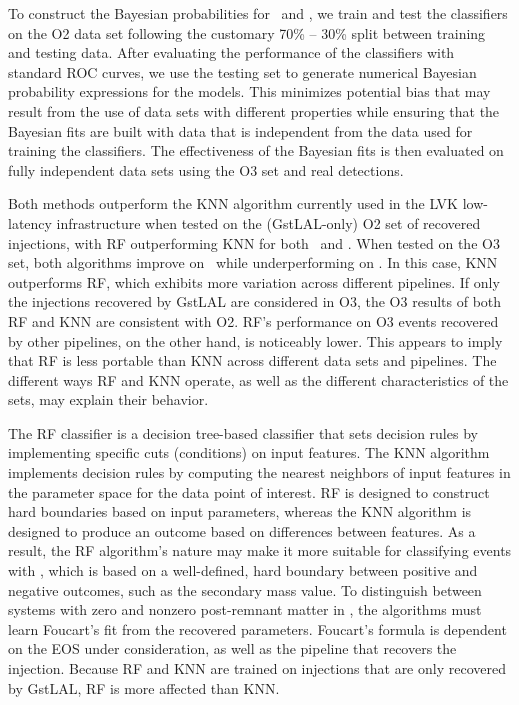 To construct the Bayesian probabilities for \hasns\ and \hasrem, we train and test the classifiers on the \ac{O2} data set following the customary 70\% -- 30\% split between
training and testing data. After evaluating the performance of the classifiers with standard \ac{ROC} curves, we use the testing set to generate numerical Bayesian probability
expressions for the models. This minimizes potential bias that may result from the use of data sets with different properties while ensuring that the Bayesian fits are built with
data that is independent from the data used for training the classifiers. The effectiveness of the Bayesian fits is then evaluated on fully independent data sets using the
\ac{O3} set and real detections. 


Both methods outperform the \ac{KNN} algorithm currently used in the \ac{LVK} low-latency infrastructure when tested on the (GstLAL-only) \ac{O2} set of recovered injections, with
\ac{RF} outperforming \ac{KNN} for both \hasns\ and \hasrem. When tested on the \ac{O3} set, both algorithms improve on \hasns\ while underperforming on \hasrem.  In this case,
\ac{KNN} outperforms \ac{RF}, which exhibits more variation across different pipelines.  If only the injections recovered by GstLAL are considered in \ac{O3}, the \ac{O3} results of
both \ac{RF} and \ac{KNN} are consistent with \ac{O2}. \ac{RF}'s performance on \ac{O3} events recovered by other pipelines, on the other hand, is noticeably lower. This appears to
imply that \ac{RF} is less portable than \ac{KNN} across different data sets and pipelines. The different ways \ac{RF} and \ac{KNN} operate, as well as the different characteristics
of the sets, may explain their behavior.

The RF classifier is a decision tree-based classifier that sets decision rules by implementing specific cuts (conditions) on input features. The \ac{KNN} algorithm implements decision rules by computing the nearest neighbors of input features in the parameter space for the data point of interest. \ac{RF} is designed to construct hard boundaries based on input parameters, whereas the \ac{KNN} algorithm is designed to produce an outcome based on differences between features. As a result, the \ac{RF} algorithm's nature may make it more suitable for classifying events with \hasns, which is based on a well-defined, hard boundary between positive and negative outcomes, such as the secondary mass value. To distinguish between systems with zero and nonzero post-remnant matter in \hasrem, the algorithms must learn Foucart's fit from the recovered parameters. Foucart's formula is dependent on the \ac{EOS} under consideration, as well as the pipeline that recovers the injection. Because \ac{RF} and \ac{KNN} are trained on injections that are only recovered by GstLAL, \ac{RF} is more affected than \ac{KNN}.

